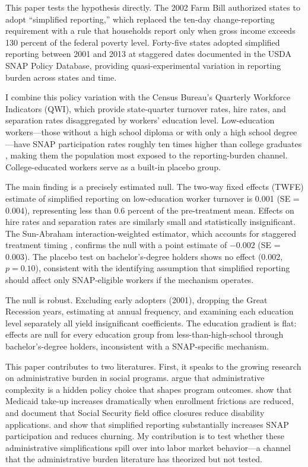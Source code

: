 \documentclass[12pt]{article}
\begin{document}
This paper tests the hypothesis directly. The 2002 Farm Bill authorized states to adopt ``simplified reporting,'' which replaced the ten-day change-reporting requirement with a rule that households report only when gross income exceeds 130 percent of the federal poverty level. Forty-five states adopted simplified reporting between 2001 and 2013 at staggered dates documented in the USDA SNAP Policy Database, providing quasi-experimental variation in reporting burden across states and time.

I combine this policy variation with the Census Bureau's Quarterly Workforce Indicators (QWI), which provide state-quarter turnover rates, hire rates, and separation rates disaggregated by workers' education level. Low-education workers---those without a high school diploma or with only a high school degree---have SNAP participation rates roughly ten times higher than college graduates \citep{gray2019snap}, making them the population most exposed to the reporting-burden channel. College-educated workers serve as a built-in placebo group.

The main finding is a precisely estimated null. The two-way fixed effects (TWFE) estimate of simplified reporting on low-education worker turnover is 0.001 (SE = 0.004), representing less than 0.6 percent of the pre-treatment mean. Effects on hire rates and separation rates are similarly small and statistically insignificant. The Sun-Abraham interaction-weighted estimator, which accounts for staggered treatment timing \citep{sun2021estimating}, confirms the null with a point estimate of $-0.002$ (SE = 0.003). The placebo test on bachelor's-degree holders shows no effect (0.002, $p = 0.10$), consistent with the identifying assumption that simplified reporting should affect only SNAP-eligible workers if the mechanism operates.

The null is robust. Excluding early adopters (2001), dropping the Great Recession years, estimating at annual frequency, and examining each education level separately all yield insignificant coefficients. The education gradient is flat: effects are null for every education group from less-than-high-school through bachelor's-degree holders, inconsistent with a SNAP-specific mechanism.

This paper contributes to two literatures. First, it speaks to the growing research on administrative burden in social programs. \citet{herd2015administrative} argue that administrative complexity is a hidden policy choice that shapes program outcomes. \citet{finkelstein2019take} show that Medicaid take-up increases dramatically when enrollment frictions are reduced, and \citet{deshpande2019disability} document that Social Security field office closures reduce disability applications. \citet{gray2019snap} and \citet{ribar2014snap} show that simplified reporting substantially increases SNAP participation and reduces churning. My contribution is to test whether these administrative simplifications spill over into labor market behavior---a channel that the administrative burden literature has theorized but not tested.
\end{document}
